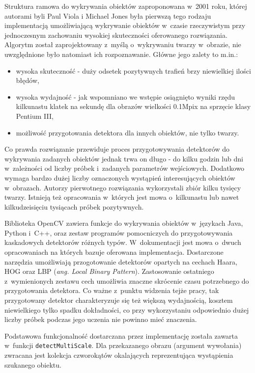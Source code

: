 Struktura ramowa do wykrywania obiektów zaproponowana w~2001 roku, której
autorami byli Paul Viola i Michael Jones była pierwszą tego
rodzaju implementacją umożliwiającą wykrywanie obiektów w~czasie
rzeczywistym przy jednoczesnym zachowaniu wysokiej skuteczności
oferowanego rozwiązania. Algorytm został zaprojektowany z~myślą o~wykrywaniu
twarzy w~obrazie, nie uwzględnione było natomiast ich rozpoznawanie.
Główne jego zalety to m.in.:

\begin{itemize}
\item wysoka skuteczność - duży odsetek pozytywnych trafień brzy niewielkiej
ilości błędów,
\item wysoka wydajność - jak wspomniano we wstępie osiągnięto wyniki
rzędu kilkunastu klatek na sekundę dla obrazów wielkości 0.1Mpix na sprzęcie
klasy Pentium III,
\item możliwość przygotowania detektora dla innych obiektów, nie tylko
twarzy.
\end{itemize}

Co prawda rozwiązanie przewiduje proces przygotowywania detektorów
do wykrywania zadanych obiektów jednak trwa on długo - do kilku godzin lub dni
w~zależności od liczby próbek i~zadanych parametrów wejściowych. Dodatkowo
wymaga bardzo dużej liczby oznaczonych wystąpień interesujących obiektów
w~obrazach.
Autorzy pierwotnego rozwiązania wykorzystali zbiór kilku tysięcy
twarzy. Istnieją też opracowania w~których jest mowa o~kilkunastu lub nawet
kilkudzeisięciu tysiącach próbek pozytywnych.

Biblioteka OpenCV zawiera funkcje
do wykrywania obiektów w~językach Java, Python i~C++, oraz zestaw
programów pomocniczych
do przygotowywania
kaskadowych detektorów różnych typów. W~dokumentacji
\cite{OCV:cascadeclassification}
jest mowa o~dwuch opracowaniach \cite{DBLP:conf/cvpr/ViolaJ01,
DBLP:conf/icip/LienhartM02} na których bazuje oferowana
implementacja. Dostarczone narzędzia umożliwiają przogotowanie
detektorów opartych na cechach Haara, HOG oraz LBP (\textit{ang. Local Binary
Pattern}). Zastosowanie ostatniego z~wymienionych zestawu cech umożliwia
znaczne skrócenie czasu potrzebnego do przygotowania detektora.
Co ważne z~punktu widzenia tejże pracy, tak przygotowany detektor
charakteryzuje się też większą wydajnością, kosztem niewielkiego tylko spadku
dokładności, co przy wykorzystaniu odpowiednio dużej liczby próbek
podczas jego uczenia nie powinno mieć znaczenia.

Podstawowa funkcjonalność dostarczana przez implementację została zawarta
w~funkcji \verb|detectMultiScale|\cite{OCV:cascadeclassification}.
Dla przekazanego obrazu (argument wywołania)
zwracana jest kolekcja czworokątów okalających
reprezentująca wystąpienia szukanego obiektu.

